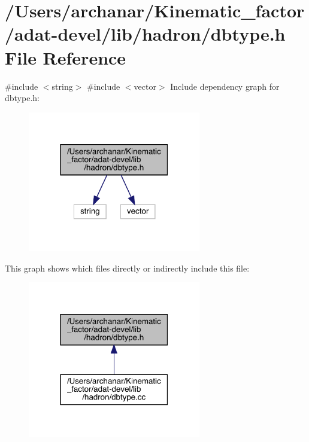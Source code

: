 \hypertarget{adat-devel_2lib_2hadron_2dbtype_8h}{}\section{/\+Users/archanar/\+Kinematic\+\_\+factor/adat-\/devel/lib/hadron/dbtype.h File Reference}
\label{adat-devel_2lib_2hadron_2dbtype_8h}
{\ttfamily \#include $<$string$>$}\newline
{\ttfamily \#include $<$vector$>$}\newline
Include dependency graph for dbtype.\+h\+:
\nopagebreak
\begin{figure}[H]
\begin{center}
\leavevmode
\includegraphics[width=214pt]{d1/da9/adat-devel_2lib_2hadron_2dbtype_8h__incl}
\end{center}
\end{figure}
This graph shows which files directly or indirectly include this file\+:
\nopagebreak
\begin{figure}[H]
\begin{center}
\leavevmode
\includegraphics[width=214pt]{d3/d66/adat-devel_2lib_2hadron_2dbtype_8h__dep__incl}
\end{center}
\end{figure}
